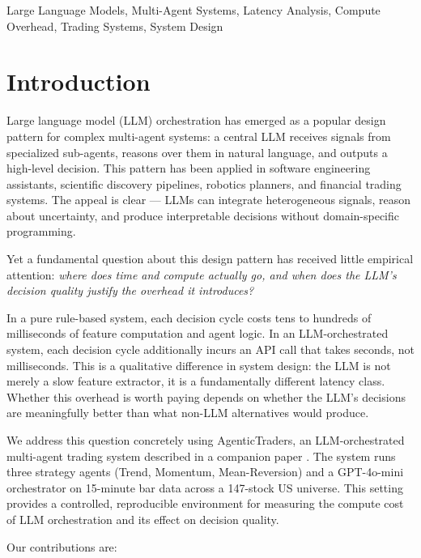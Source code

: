 \documentclass[10pt,conference]{IEEEtran}
\begin{document}
\begin{IEEEkeywords}
Large Language Models, Multi-Agent Systems, Latency Analysis, Compute Overhead, Trading Systems, System Design
\end{IEEEkeywords}

\section{Introduction}

Large language model (LLM) orchestration has emerged as a popular design pattern for complex multi-agent systems: a central LLM receives signals from specialized sub-agents, reasons over them in natural language, and outputs a high-level decision. This pattern has been applied in software engineering assistants, scientific discovery pipelines, robotics planners, and financial trading systems. The appeal is clear --- LLMs can integrate heterogeneous signals, reason about uncertainty, and produce interpretable decisions without domain-specific programming.

Yet a fundamental question about this design pattern has received little empirical attention: \textit{where does time and compute actually go, and when does the LLM's decision quality justify the overhead it introduces?}

In a pure rule-based system, each decision cycle costs tens to hundreds of milliseconds of feature computation and agent logic. In an LLM-orchestrated system, each decision cycle additionally incurs an API call that takes seconds, not milliseconds. This is a qualitative difference in system design: the LLM is not merely a slow feature extractor, it is a fundamentally different latency class. Whether this overhead is worth paying depends on whether the LLM's decisions are meaningfully better than what non-LLM alternatives would produce.

We address this question concretely using AgenticTraders, an LLM-orchestrated multi-agent trading system described in a companion paper \cite{companion}. The system runs three strategy agents (Trend, Momentum, Mean-Reversion) and a GPT-4o-mini orchestrator on 15-minute bar data across a 147-stock US universe. This setting provides a controlled, reproducible environment for measuring the compute cost of LLM orchestration and its effect on decision quality.

Our contributions are:
\end{document}

